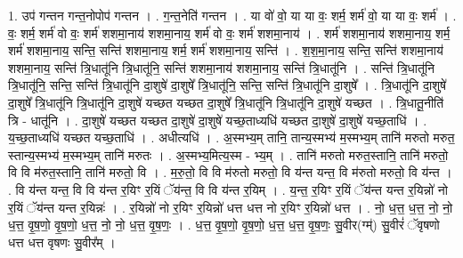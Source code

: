 \documentclass[17pt]{extarticle}
\begin{document}
1. उप॑ गन्तन गन्त॒नोपोप॑ गन्तन । . ग॒न्त॒नेति॑ गन्तन । . या वो॑ वो॒ या या वः॒ शर्म॒ शर्म॑ वो॒ या या वः॒ शर्म॑ । . वः॒ शर्म॒ शर्म॑ वो वः॒ शर्म॑ शशमा॒नाय॑ शशमा॒नाय॒ शर्म॑ वो वः॒ शर्म॑ शशमा॒नाय॑ । . शर्म॑ शशमा॒नाय॑ शशमा॒नाय॒ शर्म॒ शर्म॑ शशमा॒नाय॒ सन्ति॒ सन्ति॑ शशमा॒नाय॒ शर्म॒ शर्म॑ शशमा॒नाय॒ सन्ति॑ । . श॒श॒मा॒नाय॒ सन्ति॒ सन्ति॑ शशमा॒नाय॑ शशमा॒नाय॒ सन्ति॑ त्रि॒धातू॑नि त्रि॒धातू॑नि॒ सन्ति॑ शशमा॒नाय॑ शशमा॒नाय॒ सन्ति॑ त्रि॒धातू॑नि । . सन्ति॑ त्रि॒धातू॑नि त्रि॒धातू॑नि॒ सन्ति॒ सन्ति॑ त्रि॒धातू॑नि दा॒शुषे॑ दा॒शुषे᳚ त्रि॒धातू॑नि॒ सन्ति॒ सन्ति॑ त्रि॒धातू॑नि दा॒शुषे᳚ । . त्रि॒धातू॑नि दा॒शुषे॑ दा॒शुषे᳚ त्रि॒धातू॑नि त्रि॒धातू॑नि दा॒शुषे॑ यच्छत यच्छत दा॒शुषे᳚ त्रि॒धातू॑नि त्रि॒धातू॑नि दा॒शुषे॑ यच्छत । . त्रि॒धातू॒नीति॑ त्रि - धातू॑नि । . दा॒शुषे॑ यच्छत यच्छत दा॒शुषे॑ दा॒शुषे॑ यच्छ॒ताध्यधि॑ यच्छत दा॒शुषे॑ दा॒शुषे॑ यच्छ॒ताधि॑ । . य॒च्छ॒ताध्यधि॑ यच्छत यच्छ॒ताधि॑ । . अधीत्यधि॑ । . अ॒स्मभ्य॒म् तानि॒ तान्य॒स्मभ्य॑ म॒स्मभ्य॒म् तानि॑ मरुतो मरुत॒ स्तान्य॒स्मभ्य॑ म॒स्मभ्य॒म् तानि॑ मरुतः । . अ॒स्मभ्य॒मित्य॒स्म - भ्य॒म् । . तानि॑ मरुतो मरुत॒स्तानि॒ तानि॑ मरुतो॒ वि वि म॑रुत॒स्तानि॒ तानि॑ मरुतो॒ वि । . म॒रु॒तो॒ वि वि म॑रुतो मरुतो॒ वि य॑न्त यन्त॒ वि म॑रुतो मरुतो॒ वि य॑न्त । . वि य॑न्त यन्त॒ वि वि य॑न्त र॒यिꣳ र॒यिं ॅय॑न्त॒ वि वि य॑न्त र॒यिम् । . य॒न्त॒ र॒यिꣳ र॒यिं ॅय॑न्त यन्त र॒यिन्नो॑ नो र॒यिं ॅय॑न्त यन्त र॒यिन्नः॑ । . र॒यिन्नो॑ नो र॒यिꣳ र॒यिन्नो॑ धत्त धत्त नो र॒यिꣳ र॒यिन्नो॑ धत्त । . नो॒ ध॒त्त॒ ध॒त्त॒ नो॒ नो॒ ध॒त्त॒ वृ॒ष॒णो॒ वृ॒ष॒णो॒ ध॒त्त॒ नो॒ नो॒ ध॒त्त॒ वृ॒ष॒णः॒ । . ध॒त्त॒ वृ॒ष॒णो॒ वृ॒ष॒णो॒ ध॒त्त॒ ध॒त्त॒ वृ॒ष॒णः॒ सु॒वीर(ग्म्॑) सु॒वीरं॑ ॅवृषणो धत्त धत्त वृषणः सु॒वीर᳚म् । \newline
\end{document}
